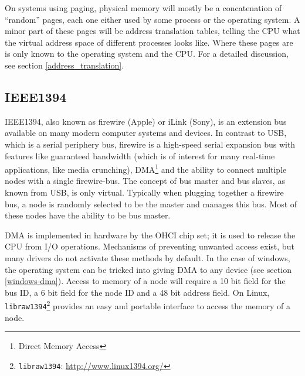 On systems using paging, physical memory will mostly be a concatenation of
``random'' pages, each one either used by some process or the operating system.
A minor part of these pages will be address translation tables, telling the CPU
what the virtual address space of different processes looks like. Where these
pages are is only known to the operating system and the CPU.  For a detailed
discussion, see section \ref{address_translation}.



\subsection{IEEE1394}

\label{phys1394}
IEEE1394, also known as \epsfysize 0.3cm 
firewire (Apple) or iLink (Sony), is an extension bus available on many modern
computer systems and devices.  In contrast to USB, which is a serial periphery
bus, firewire is a high-speed serial expansion bus with features like guaranteed
bandwidth (which is of interest for many real-time applications, like media
crunching), DMA\footnote{Direct Memory Access} and the ability to connect
multiple nodes with a single firewire-bus.  The concept of bus master and bus
slaves, as known from USB, is only virtual.  Typically when plugging together a
firewire bus, a node is randomly selected to be the master and manages this bus.
Most of these nodes have the ability to be bus master.

DMA is implemented in hardware by the OHCI chip set; it is used to release the
CPU from I/O operations. Mechanisms of preventing unwanted access exist, but
many drivers do not activate these methods by default. In the case of windows,
the operating system can be tricked into giving DMA to any device (see section
\ref{windows-dma}).
Access to memory of a node will require a 10 bit field for the bus ID, a 6 bit
field for the node ID and a 48 bit address field.  On Linux,
\texttt{libraw1394}\footnote{\texttt{libraw1394}:
\href{http://www.linux1394.org/}{http://www.linux1394.org/}} provides an easy
and portable interface to access the memory of a node. %

